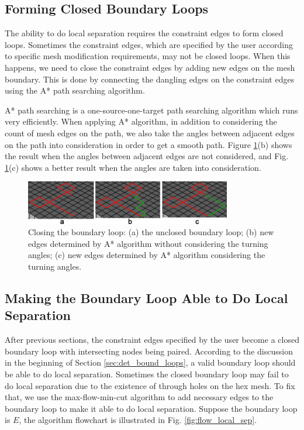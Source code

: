 \documentclass[final,5p,times,twocolumn]{elsarticle}
\begin{document}
\subsection{Forming Closed Boundary Loops}
\label{sec:close_bound_loop}
The ability to do local separation requires the constraint edges to form closed loops. Sometimes the constraint edges, which are specified by the user according to specific mesh modification requirements, may not be closed loops. When this happens, we need to close the constraint edges by adding new edges on the mesh boundary. This is done by connecting the dangling edges on the constraint edges using the A* path searching algorithm.

A* path searching is a one-source-one-target path searching algorithm which runs very efficiently. When applying A* algorithm, in addition to considering the count of mesh edges on the path, we also take the angles between adjacent edges on the path into consideration in order to get a smooth path. Figure \ref{fig:close_loop}(b) shows the result when the angles between adjacent edges are not considered, and Fig. \ref{fig:close_loop}(c) shows a better result when the angles are taken into consideration.

\begin{figure}[htbp]
\begin{center}
\includegraphics[width=9cm]{figures/close_loop.png}
\caption{Closing the boundary loop: (a) the unclosed boundary loop; (b) new edges determined by A* algorithm without considering the turning angles; (c) new edges determined by A* algorithm considering the turning angles.}
\label{fig:close_loop}
\end{center}
\end{figure}

\subsection{Making the Boundary Loop Able to Do Local Separation}
\label{sec:local_separation}
After previous sections, the constraint edges specified by the user become a closed boundary loop with intersecting nodes being paired. According to the discussion in the beginning of Section \ref{sec:det_bound_loops}, a valid boundary loop should be able to do local separation. Sometimes the closed boundary loop may fail to do local separation due to the existence of through holes on the hex mesh. To fix that, we use the max-flow-min-cut algorithm to add necessary edges to the boundary loop to make it able to do local separation. Suppose the boundary loop is $E$, the algorithm flowchart is illustrated in Fig. \ref{fig:flow_local_sep}.
\end{document}
